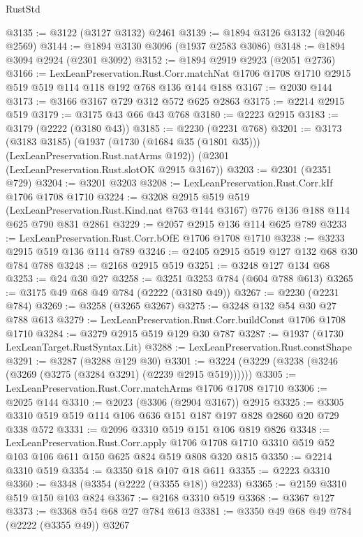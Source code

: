 \begin{lexlean}{RustStd}
\begin{coremodule}
@3135 := @3122 (@3127 @3132) @2461
@3139 := @1894 @3126 @3132 (@2046 @2569)
@3144 := @1894 @3130 @3096 (@1937 @2583 @3086)
@3148 := @1894 @3094 @2924 (@2301 @3092)
@3152 := @1894 @2919 @2923 (@2051 @2736)
@3166 := LexLeanPreservation.Rust.Corr.matchNat
    @1706
    @1708
    @1710
    @2915
    @519
    @519
    @114
    @118
    @192
    @768
    @136
    @144
    @188
@3167 := @2030 @144
@3173 := @3166 @3167 @729 @312 @572 @625 @2863
@3175 := @2214 @2915 @519
@3179 := @3175 @43 @66 @43 @768
@3180 := @2223 @2915
@3183 := @3179 (@2222 (@3180 @43))
@3185 := @2230 (@2231 @768)
@3201 := @3173
    (@3183 @3185)
    (@1937 (@1730 (@1684 @35 (@1801 @35))) (LexLeanPreservation.Rust.natArms @192))
    (@2301 (LexLeanPreservation.Rust.slotOK @2915 @3167))
@3203 := @2301 (@2351 @729)
@3204 := @3201 @3203
@3208 := LexLeanPreservation.Rust.Corr.kIf @1706 @1708 @1710
@3224 := @3208
    @2915
    @519
    @519
    (LexLeanPreservation.Rust.Kind.nat @763 @144 @3167)
    @776
    @136
    @188
    @114
    @625
    @790
    @831
    @2861
@3229 := @2057 @2915 @136 @114 @625 @789
@3233 := LexLeanPreservation.Rust.Corr.bOfE @1706 @1708 @1710
@3238 := @3233 @2915 @519 @136 @114 @789
@3246 := @2405 @2915 @519 @127 @132 @68 @30 @784 @788
@3248 := @2168 @2915 @519
@3251 := @3248 @127 @134 @68
@3253 := @24 @30 @27
@3258 := @3251 @3253 @784 (@604 @788 @613)
@3265 := @3175 @49 @68 @49 @784 (@2222 (@3180 @49))
@3267 := @2230 (@2231 @784)
@3269 := @3258 (@3265 @3267)
@3275 := @3248 @132 @54 @30 @27 @788 @613
@3279 := LexLeanPreservation.Rust.Corr.buildConst @1706 @1708 @1710
@3284 := @3279 @2915 @519 @129 @30 @787
@3287 := @1937 (@1730 LexLeanTarget.RustSyntax.Lit)
@3288 := LexLeanPreservation.Rust.constShape
@3291 := @3287 (@3288 @129 @30)
@3301 := @3224 (@3229 (@3238 (@3246 (@3269 (@3275 (@3284 @3291) (@2239 @2915 @519))))))
@3305 := LexLeanPreservation.Rust.Corr.matchArms @1706 @1708 @1710
@3306 := @2025 @144
@3310 := @2023 (@3306 (@2904 @3167)) @2915
@3325 := @3305 @3310 @519 @519 @114 @106 @636 @151 @187 @197 @828 @2860 @20 @729 @338 @572
@3331 := @2096 @3310 @519 @151 @106 @819 @826
@3348 := LexLeanPreservation.Rust.Corr.apply
    @1706
    @1708
    @1710
    @3310
    @519
    @52
    @103
    @106
    @611
    @150
    @625
    @824
    @519
    @808
    @320
    @815
@3350 := @2214 @3310 @519
@3354 := @3350 @18 @107 @18 @611
@3355 := @2223 @3310
@3360 := @3348 (@3354 (@2222 (@3355 @18)) @2233)
@3365 := @2159 @3310 @519 @150 @103 @824
@3367 := @2168 @3310 @519
@3368 := @3367 @127
@3373 := @3368 @54 @68 @27 @784 @613
@3381 := @3350 @49 @68 @49 @784 (@2222 (@3355 @49)) @3267

\end{coremodule}
\end{lexlean}
